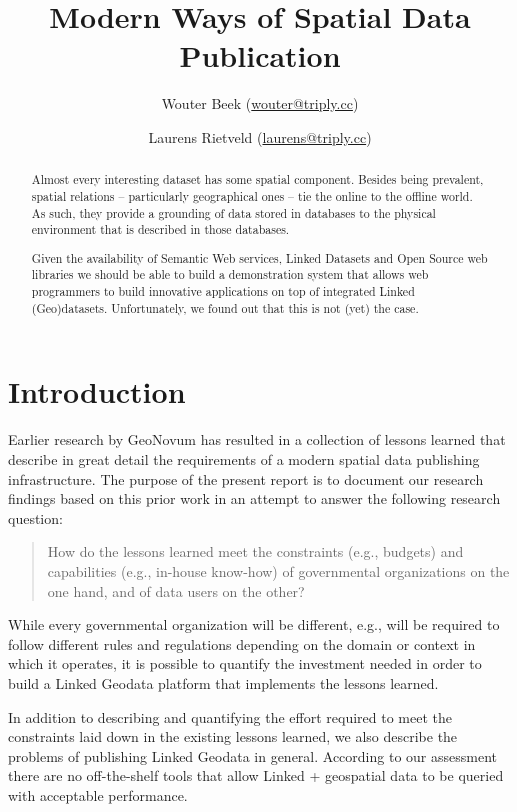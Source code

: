 \documentclass[a4paper]{scrartcl}
\title{Modern Ways of Spatial Data Publication}
\author{Wouter Beek ({\small\url{wouter@triply.cc}})}
\author{Laurens Rietveld ({\small\url{laurens@triply.cc}})}
\affil{Triply ({\small\url{http://triply.cc}})}
\begin{document}
\maketitle

\begin{abstract}
  \noindent Almost every interesting dataset has some spatial
  component.  Besides being prevalent, spatial relations --
  particularly geographical ones -- tie the online to the offline
  world.  As such, they provide a grounding of data stored in
  databases to the physical environment that is described in those
  databases.

  Given the availability of Semantic Web services, Linked Datasets and
  Open Source web libraries we should be able to build a demonstration
  system that allows web programmers to build innovative applications
  on top of integrated Linked (Geo)datasets.  Unfortunately, we found
  out that this is not (yet) the case.
\end{abstract}


\section{Introduction}

Earlier research by GeoNovum has resulted in a collection of lessons
learned that describe in great detail the requirements of a modern
spatial data publishing infrastructure.  The purpose of the present
report is to document our research findings based on this prior work
in an attempt to answer the following research question:

\begin{quote}
  How do the lessons learned meet the constraints (e.g., budgets) and
  capabilities (e.g., in-house know-how) of governmental organizations
  on the one hand, and of data users on the other?
\end{quote}

While every governmental organization will be different, e.g., will be
required to follow different rules and regulations depending on the
domain or context in which it operates, it is possible to quantify the
investment needed in order to build a Linked Geodata platform that
implements the lessons learned.

In addition to describing and quantifying the effort required to meet
the constraints laid down in the existing lessons learned, we also
describe the problems of publishing Linked Geodata in general.
According to our assessment there are no off-the-shelf tools that
allow Linked + geospatial data to be queried with acceptable
performance.
\end{document}
